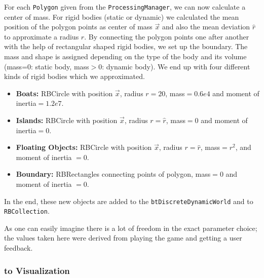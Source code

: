 For each \texttt{Polygon} given from the \texttt{ProcessingManager}, we can now calculate a center of mass. For rigid bodies (static or dynamic) we calculated the mean position of the polygon points as center of mass $\overrightarrow{x}$ and also the mean deviation $\hat{r}$ to approximate a radius $r$. By connecting the polygon points one after another with the help of rectangular shaped rigid bodies, we set up the boundary. The mass and shape is assigned depending on the type of the body and its volume (mass=0: static body, mass$>$0: dynamic body). We end up with four different kinds of rigid bodies which we approximated.
\begin{itemize}
\item \textbf{Boats:} RBCircle with position $\overrightarrow{x}$, radius $r=20$, mass$=0.6e4$ and moment of inertia$=1.2e7$.
\item \textbf{Islands:} RBCircle with position $\overrightarrow{x}$, radius $r=\hat{r}$, mass$=0$ and moment of inertia$=0$.
\item \textbf{Floating Objects:} RBCircle with position $\overrightarrow{x}$, radius $r=\hat{r}$, mass$=r^2$, and moment of inertia $=0$.
\item \textbf{Boundary:} RBRectangles connecting points of polygon, mass$=0$ and moment of inertia $=0$.
\end{itemize}
In the end, these new objects are added to the \texttt{btDiscreteDynamicWorld} and to \texttt{RBCollection}.


As one can easily imagine there is a lot of freedom in the exact parameter choice; the values taken here were derived from playing the game and getting a user feedback.

\subsubsection{to Visualization}


